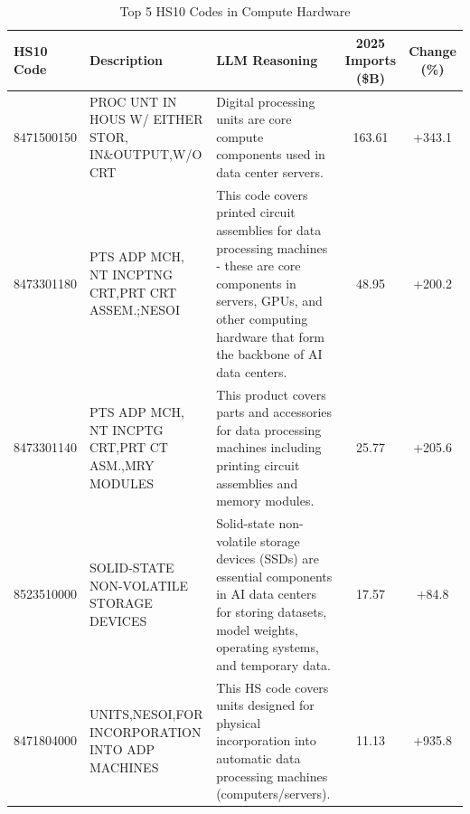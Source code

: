 
\begin{table}[htbp]
\centering
\small
\caption{Top 5 HS10 Codes in Compute Hardware}
\label{tab:top5_compute_hardware}
\setlength{\tabcolsep}{1.25mm}
\renewcommand{\arraystretch}{1.80}
\begin{tabular}{lp{3.5cm}p{3.5cm}cc}
\toprule
HS10 Code & Description & LLM Reasoning & 2025 Imports (\$B) & Change (\%) \\
\midrule
8471500150 & {\footnotesize PROC UNT IN HOUS W/ EITHER STOR, IN\&OUTPUT,W/O CRT} & {\footnotesize Digital processing units are core compute components used in data center servers.} & 163.61 & +343.1 \\
8473301180 & {\footnotesize PTS ADP MCH, NT INCPTNG CRT,PRT CRT ASSEM.;NESOI} & {\footnotesize This code covers printed circuit assemblies for data processing machines - these are core components in servers, GPUs, and other computing hardware that form the backbone of AI data centers.} & 48.95 & +200.2 \\
8473301140 & {\footnotesize PTS ADP MCH, NT INCPTG CRT,PRT CT ASM.,MRY MODULES} & {\footnotesize This product covers parts and accessories for data processing machines including printing circuit assemblies and memory modules.} & 25.77 & +205.6 \\
8523510000 & {\footnotesize SOLID-STATE NON-VOLATILE STORAGE DEVICES} & {\footnotesize Solid-state non-volatile storage devices (SSDs) are essential components in AI data centers for storing datasets, model weights, operating systems, and temporary data.} & 17.57 & +84.8 \\
8471804000 & {\footnotesize UNITS,NESOI,FOR INCORPORATION INTO ADP MACHINES} & {\footnotesize This HS code covers units designed for physical incorporation into automatic data processing machines (computers/servers).} & 11.13 & +935.8 \\
\bottomrule
\end{tabular}
\end{table}


